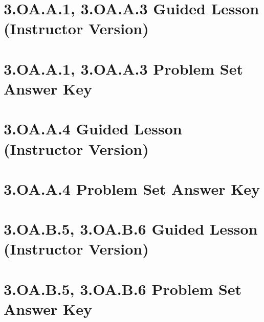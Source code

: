 \documentclass[a4paper,12pt]{article}
\title{}
\date{}
\begin{document}
\hypertarget{toc}{}  %
\tableofcontents
\newpage

\pagestyle{fancy}  %

\newpage
\section{3.OA.A.1, 3.OA.A.3 Guided Lesson (Instructor Version)}


\newpage
\section{3.OA.A.1, 3.OA.A.3 Problem Set Answer Key}


\newpage
\section{3.OA.A.4 Guided Lesson (Instructor Version)}


\newpage
\section{3.OA.A.4 Problem Set Answer Key}


\newpage
\section{3.OA.B.5, 3.OA.B.6 Guided Lesson (Instructor Version)}


\newpage
\section{3.OA.B.5, 3.OA.B.6 Problem Set Answer Key}

\end{document}
